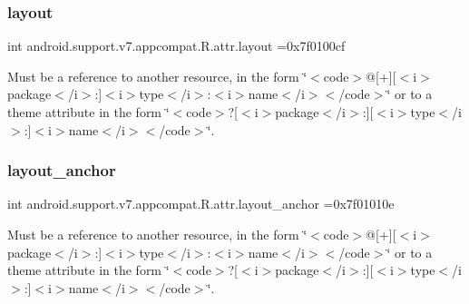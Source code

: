 \subsubsection{\texorpdfstring{layout}{layout}}
{\footnotesize\ttfamily int android.\+support.\+v7.\+appcompat.\+R.\+attr.\+layout =0x7f0100cf\hspace{0.3cm}{\ttfamily [static]}}

Must be a reference to another resource, in the form \char`\"{}$<$code$>$@\mbox{[}+\mbox{]}\mbox{[}$<$i$>$package$<$/i$>$\+:\mbox{]}$<$i$>$type$<$/i$>$\+:$<$i$>$name$<$/i$>$$<$/code$>$\char`\"{} or to a theme attribute in the form \char`\"{}$<$code$>$?\mbox{[}$<$i$>$package$<$/i$>$\+:\mbox{]}\mbox{[}$<$i$>$type$<$/i$>$\+:\mbox{]}$<$i$>$name$<$/i$>$$<$/code$>$\char`\"{}. \mbox{\label{classandroid_1_1support_1_1v7_1_1appcompat_1_1R_1_1attr_a394f8b20bd8121817fc5d993a0236314}} 
\subsubsection{\texorpdfstring{layout\+\_\+anchor}{layout\_anchor}}
{\footnotesize\ttfamily int android.\+support.\+v7.\+appcompat.\+R.\+attr.\+layout\+\_\+anchor =0x7f01010e\hspace{0.3cm}{\ttfamily [static]}}

Must be a reference to another resource, in the form \char`\"{}$<$code$>$@\mbox{[}+\mbox{]}\mbox{[}$<$i$>$package$<$/i$>$\+:\mbox{]}$<$i$>$type$<$/i$>$\+:$<$i$>$name$<$/i$>$$<$/code$>$\char`\"{} or to a theme attribute in the form \char`\"{}$<$code$>$?\mbox{[}$<$i$>$package$<$/i$>$\+:\mbox{]}\mbox{[}$<$i$>$type$<$/i$>$\+:\mbox{]}$<$i$>$name$<$/i$>$$<$/code$>$\char`\"{}. \mbox{\label{classandroid_1_1support_1_1v7_1_1appcompat_1_1R_1_1attr_a7746918fec5990cb35abc69535991375}} 
